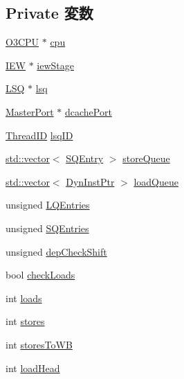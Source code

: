 \subsection*{Private 変数}
\begin{DoxyCompactItemize}
\item 
\hyperlink{classLSQUnit_a44622cf06940413482836cb62931ac3f}{O3CPU} $\ast$ \hyperlink{classLSQUnit_a1379cf882a12ac6fc9eba5da7c84b18b}{cpu}
\item 
\hyperlink{classLSQUnit_a23f60a4095b5240dfcb18a4ec40210a9}{IEW} $\ast$ \hyperlink{classLSQUnit_a4e9ef25d8913b270d432be4bbfe4965c}{iewStage}
\item 
\hyperlink{classLSQ}{LSQ} $\ast$ \hyperlink{classLSQUnit_ac0894e8141823f8eea2c9041bac9dab4}{lsq}
\item 
\hyperlink{classMasterPort}{MasterPort} $\ast$ \hyperlink{classLSQUnit_a2bbddd281625b8b4d716708925673445}{dcachePort}
\item 
\hyperlink{base_2types_8hh_ab39b1a4f9dad884694c7a74ed69e6a6b}{ThreadID} \hyperlink{classLSQUnit_a0ee490ba978f48fbf2579acc7eb60b24}{lsqID}
\item 
\hyperlink{classstd_1_1vector}{std::vector}$<$ \hyperlink{structLSQUnit_1_1SQEntry}{SQEntry} $>$ \hyperlink{classLSQUnit_a1d370cdc36d253e0f786d46c6af77a40}{storeQueue}
\item 
\hyperlink{classstd_1_1vector}{std::vector}$<$ \hyperlink{classLSQUnit_a028ce10889c5f6450239d9e9a7347976}{DynInstPtr} $>$ \hyperlink{classLSQUnit_aa5f3703c5d7c5ce21a497352b94c7465}{loadQueue}
\item 
unsigned \hyperlink{classLSQUnit_aafa99d800d574095881acbacdbbbcc47}{LQEntries}
\item 
unsigned \hyperlink{classLSQUnit_a38c8af5392da70119dc5cce4e3637cbc}{SQEntries}
\item 
unsigned \hyperlink{classLSQUnit_ab5dfaaa13f279adbed7a1eafea047796}{depCheckShift}
\item 
bool \hyperlink{classLSQUnit_a602a9ccaf8b313e8923d8b07ec5bc439}{checkLoads}
\item 
int \hyperlink{classLSQUnit_a867971f18e464abd16193e069c64a8ad}{loads}
\item 
int \hyperlink{classLSQUnit_ade9e895aa9c5ace27779c985c4f43326}{stores}
\item 
int \hyperlink{classLSQUnit_a3831a7965ffbe90df177026988476f9c}{storesToWB}
\item 
int \hyperlink{classLSQUnit_ac09af89928d2ef4da4cbdcfce26fa3f5}{loadHead}
\item 

\end{DoxyCompactItemize}

